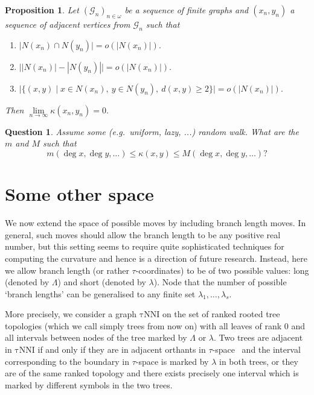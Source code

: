 \documentclass{amsart}
\newtheorem{question}{Question}
\newtheorem{proposition}{Proposition}
\newcommand{\tN}{\mathrm{\tau NNI}}
\begin{document}
\begin{proposition}
Let $(\mathcal G_n)_{n \in \omega}$ be a sequence of finite graphs and 
$(x_n, y_n)$ a sequence of adjacent vertices from $\mathcal G_n$ such that
\begin{enumerate}[(1)]
\item $\big|N(x_n) \cap N(y_n)\big| = o(|N(x_n)|).$ 
\item $\big||N(x_n)| - |N(y_n)|\big| = o(|N(x_n)|).$ 
\item $\big|\{(x,y) \mid x \in N(x_n),~ y \in N(y_n),~ d(x, y) \geq 2\}\big| 
= o(|N(x_n)|).$
\end{enumerate}

Then $\lim\limits_{n \to \infty} \kappa(x_n, y_n) = 0.$
\end{proposition}

\proof

\endproof

\begin{question}
Assume some (e.g.\ uniform, lazy, ...) random walk. What are the $m$ and $M$ 
such that 
\[
m(\deg x,\deg y, \ldots) \leq \kappa(x,y) \leq M(\deg x, \deg y, \ldots)? 
\]
\end{question}

\section{Some other space}

We now extend the space of possible moves by including branch length moves. 
In general, such moves should allow the branch length to be any positive real 
number, but this setting seems to require quite sophisticated techniques for 
computing the curvature and hence is a direction of future research. 
Instead, here we allow branch length (or rather $\tau$-coordinates) 
to be of two possible values: long (denoted by $\Lambda$) and short (denoted 
by $\lambda$). Node that the number of possible `branch lengths' can be 
generalised to any finite set $\lambda_1,\ldots,\lambda_s$.

More precisely, we consider a graph $\tN$ on the set of ranked rooted tree 
topologies (which we call simply trees from now on) with all leaves of rank 
$0$ and all intervals between nodes of the tree marked by $\Lambda$ or
$\lambda$. Two trees are adjacent in $\tN$ if and only if they are in 
adjacent orthants in $\tau$-space~\cite{Gavryushkin2014-bw} and the interval corresponding 
to the boundary in $\tau$-space is marked by $\lambda$ in both trees, 
or they are of the same ranked topology and there 
exists precisely one interval which is marked by different symbols in 
the two trees. 
\end{document}
